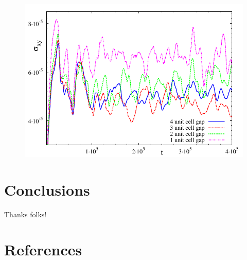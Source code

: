 \documentclass[12pt]{iopart}
\begin{document}
\begin{figure}[h]
\caption{}
\label{fig4}
\end{figure}

\begin{figure}[h]
\centering
\includegraphics[width=\textwidth]{stress_bp1_fbc.pdf}
\caption{}
\label{fig5}
\end{figure}

\section{Conclusions}

\ack
Thanks folks!


\section*{References}

\end{document}
